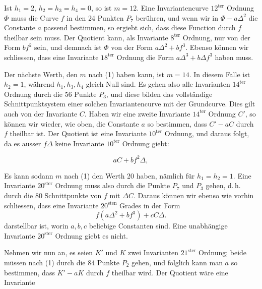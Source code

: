 Ist $h_1 = 2$, $h_2 = h_3 = h_4 = 0$, so ist $m = 12$. Eine
Invariantencurve $12^{\text{ter}}$ Ordnung $\Phi$ muss die Curve $f$ in
den 24 Punkten $P_7$ berühren, und wenn wir in $\Phi - a\Delta^2$ die
Constante $a$ passend bestimmen, so ergiebt sich, dass diese Function
durch $f$ theilbar sein muss. Der Quotient kann, als Invariante
$8^{\text{ter}}$ Ordnung, nur von der Form $bf^2$ sein, und demnach ist
$\Phi$ von der Form $a\Delta^2 + bf^3$. Ebenso können wir schliessen,
dass eine Invariante $18^{\text{ter}}$ Ordnung die Form
$a\Delta^3 + b\Delta f^3$ haben muss.

\begin{center}
\end{center}

Der nächste Werth, den $m$ nach (1) haben kann, ist $m = 14$. In
diesem Falle ist $h_2 = 1$, während $h_1, h_3, h_4$ gleich Null sind.
Es gehen also alle Invarianten $14^{\text{ter}}$ Ordnung durch die 56
Punkte $P_3$, und diese bilden das vollständige Schnittpunktsystem
einer solchen Invariantencurve mit der Grundcurve. Dies gilt auch von
der Invariante $C$. Haben wir eine zweite Invariante $14^{\text{ter}}$
Ordnung $C'$, so können wir wieder, wie oben, die Constante $a$ so
bestimmen, dass $C' - aC$ durch $f$ theilbar ist. Der Quotient ist
eine Invariante $10^{\text{ter}}$ Ordnung, und daraus folgt, da es
ausser $f\Delta$ keine Invariante $10^{\text{ter}}$ Ordnung giebt:

\begin{center}
\end{center}
\[
aC + bf^2\Delta,
\]
\begin{center}
\end{center}

Es kann sodann $m$ nach (1) den Werth 20 haben, nämlich für
$h_1 = h_2 = 1$. Eine Invariante $20^{\text{ster}}$ Ordnung muss also
durch die Punkte $P_7$ und $P_3$ gehen, d.\,h. durch die 80
Schnittpunkte von $f$ mit $\Delta C$. Daraus können wir ebenso wie
vorhin schliessen, dass eine Invariante $20^{\text{sten}}$ Grades in
der Form
\[
f(a\Delta^2 + bf^3) + cC\Delta.
\]
darstellbar ist, worin $a, b, c$ beliebige Constanten sind. Eine
unabhängige Invariante $20^{\text{ster}}$ Ordnung giebt es nicht.

Nehmen wir nun an, es seien $K'$ und $K$ zwei Invarianten
$21^{\text{ster}}$ Ordnung; beide müssen nach (1) durch die 84 Punkte
$\overline{P}_2$ gehen, und folglich kann man $a$ so bestimmen, dass
$K' - aK$ durch $f$ theilbar wird. Der Quotient wäre eine Invariante
